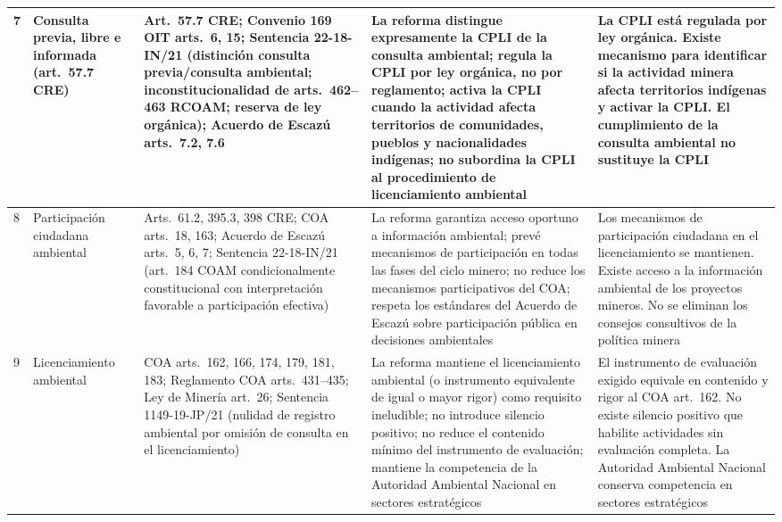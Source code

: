 \begin{longtable}{|p{}|p{}|p{}|p{}|p{}|}
7 &
Consulta previa, libre e informada (art.\ 57.7 CRE) &
Art.\ 57.7 CRE; Convenio 169 OIT arts.\ 6, 15; Sentencia 22-18-IN/21 (distinción consulta previa/consulta ambiental; inconstitucionalidad de arts.\ 462--463 RCOAM; reserva de ley orgánica); Acuerdo de Escazú arts.\ 7.2, 7.6 &
La reforma distingue expresamente la CPLI de la consulta ambiental; regula la CPLI por ley orgánica, no por reglamento; activa la CPLI cuando la actividad afecta territorios de comunidades, pueblos y nacionalidades indígenas; no subordina la CPLI al procedimiento de licenciamiento ambiental &
La CPLI está regulada por ley orgánica. Existe mecanismo para identificar si la actividad minera afecta territorios indígenas y activar la CPLI. El cumplimiento de la consulta ambiental no sustituye la CPLI \\
\hline

8 &
Participación ciudadana ambiental &
Arts.\ 61.2, 395.3, 398 CRE; COA arts.\ 18, 163; Acuerdo de Escazú arts.\ 5, 6, 7; Sentencia 22-18-IN/21 (art.\ 184 COAM condicionalmente constitucional con interpretación favorable a participación efectiva) &
La reforma garantiza acceso oportuno a información ambiental; prevé mecanismos de participación en todas las fases del ciclo minero; no reduce los mecanismos participativos del COA; respeta los estándares del Acuerdo de Escazú sobre participación pública en decisiones ambientales &
Los mecanismos de participación ciudadana en el licenciamiento se mantienen. Existe acceso a la información ambiental de los proyectos mineros. No se eliminan los consejos consultivos de la política minera \\
\hline

9 &
Licenciamiento ambiental &
COA arts.\ 162, 166, 174, 179, 181, 183; Reglamento COA arts.\ 431--435; Ley de Minería art.\ 26; Sentencia 1149-19-JP/21 (nulidad de registro ambiental por omisión de consulta en el licenciamiento) &
La reforma mantiene el licenciamiento ambiental (o instrumento equivalente de igual o mayor rigor) como requisito ineludible; no introduce silencio positivo; no reduce el contenido mínimo del instrumento de evaluación; mantiene la competencia de la Autoridad Ambiental Nacional en sectores estratégicos &
El instrumento de evaluación exigido equivale en contenido y rigor al COA art.\ 162. No existe silencio positivo que habilite actividades sin evaluación completa. La Autoridad Ambiental Nacional conserva competencia en sectores estratégicos \\
\hline


\end{longtable}
